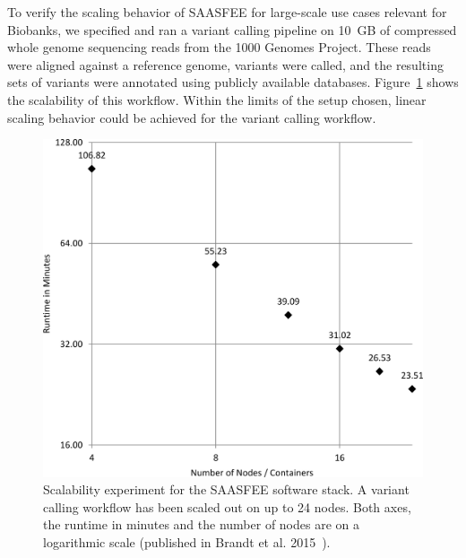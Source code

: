 
To verify the scaling behavior of SAASFEE for large-scale use cases relevant for Biobanks, we specified and ran a variant calling pipeline on 10~GB of compressed whole genome sequencing reads from the 1000 Genomes Project. These reads were aligned against a reference genome, variants were called, and the resulting sets of variants were annotated using publicly available databases. Figure~\ref{fig:saasfee_scaling} shows the scalability of this workflow. Within the limits of the setup chosen, linear scaling behavior could be achieved for the variant calling workflow.

\begin{figure}
  \centering
  \includegraphics[width=.55\textwidth]{imgs/wf_runtime.png}
  \caption{Scalability experiment for the SAASFEE software stack. A variant calling workflow has been scaled out on up to 24 nodes. Both axes, the runtime in minutes and the number of nodes are on a logarithmic scale (published in Brandt et al. 2015~\cite{Brandt2015}).}
  \label{fig:saasfee_scaling}
\end{figure}
\vspace{-5mm}
